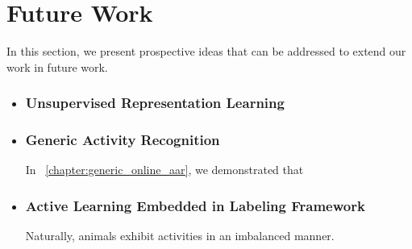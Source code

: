\section{Future Work}

In this section, we present prospective ideas that can be addressed to extend our work in future work.

\begin{itemize}

\item \subsubsection{Unsupervised Representation Learning}


\item \subsubsection{Generic Activity Recognition}

In \chaptername~\ref{chapter:generic_online_aar}, we demonstrated that

\item \subsubsection{Active Learning Embedded in Labeling Framework}

Naturally, animals exhibit activities in an imbalanced manner. 


\end{itemize}